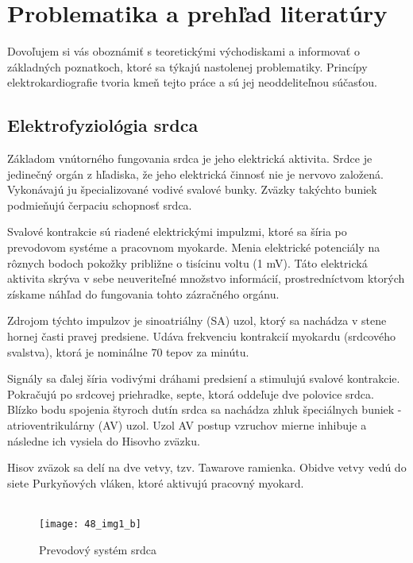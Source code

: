 \documentclass[titlepage,12pt]{article}
\begin{document}
\newpage
\section{Problematika a prehľad literatúry}
Dovoľujem si vás oboznámiť s teoretickými východiskami a informovať o základných poznatkoch, ktoré sa týkajú nastolenej problematiky. Princípy elektrokardiografie tvoria kmeň tejto práce a sú jej neoddeliteľnou súčasťou.


\subsection{Elektrofyziológia srdca}

Základom vnútorného fungovania srdca je jeho elektrická aktivita. Srdce je jedinečný orgán z hľadiska, že jeho elektrická činnosť nie je nervovo založená. Vykonávajú ju špecializované vodivé svalové bunky. Zväzky takýchto buniek podmieňujú čerpaciu schopnosť srdca.

Svalové kontrakcie sú riadené elektrickými impulzmi, ktoré sa šíria po prevodovom systéme a pracovnom myokarde. Menia elektrické potenciály na rôznych bodoch pokožky približne \linebreak o tisícinu voltu (1 mV). Táto elektrická aktivita skrýva v sebe neuveriteľné množstvo informácií, prostredníctvom ktorých získame náhľad do fungovania tohto zázračného orgánu.

Zdrojom týchto impulzov je sinoatriálny (SA) uzol, ktorý sa nachádza v stene hornej časti pravej predsiene. Udáva frekvenciu kontrakcií myokardu (srdcového svalstva), ktorá je nominálne 70 tepov za minútu.

Signály sa ďalej šíria vodivými dráhami predsiení a stimulujú svalové kontrakcie. Pokračujú po srdcovej priehradke, septe, ktorá oddeľuje dve polovice srdca. Blízko bodu spojenia štyroch dutín srdca sa nachádza zhluk špeciálnych buniek - atrioventrikulárny (AV) uzol. Uzol AV postup vzruchov mierne inhibuje a následne ich vysiela do Hisovho zväzku.

Hisov zväzok  sa delí na dve vetvy, tzv. Tawarove ramienka. Obidve vetvy vedú do siete Purkyňových vláken, ktoré aktivujú pracovný myokard.
\\
\\

\begin{figure}[!ht]
\begin{center}
\texttt{[image: 48\_img1\_b]}
\caption{Prevodový systém srdca}
\end{center}
\end{figure}
\end{document}
